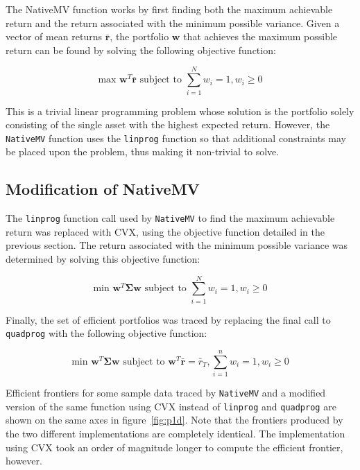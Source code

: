 \documentclass[a4paper, 12pt]{article}
\begin{document}
	The NativeMV function works by first finding both the maximum achievable return and the return associated with the minimum possible variance. Given a vector of mean returns $\bar{\mathbf{r}}$, the portfolio $\mathbf{w}$ that achieves the maximum possible return can be found by solving the following objective function:

	\[\text{max } \mathbf{w}^T \bar{\mathbf{r}} \text{ subject to } \sum_{i=1}^N w_i = 1, w_i \geq 0\]

	This is a trivial linear programming problem whose solution is the portfolio solely consisting of the single asset with the highest expected return. However, the \texttt{NativeMV} function uses the \texttt{linprog} function so that additional constraints may be placed upon the problem, thus making it non-trivial to solve.

	\subsection{Modification of NativeMV}

	The \texttt{linprog} function call used by \texttt{NativeMV} to find the maximum achievable return was replaced with CVX, using the objective function detailed in the previous section. The return associated with the minimum possible variance was determined by solving this objective function:

	\[\text{min } \mathbf{w}^T \mathbf{\Sigma w} \text{ subject to } \sum_{i=1}^N w_i = 1, w_i \geq 0\]

	Finally, the set of efficient portfolios was traced by replacing the final call to \texttt{quadprog} with the following objective function:

	\[\text{min } \mathbf{w}^T \mathbf{\Sigma w} \text{ subject to } \mathbf{w}^T \bar{\mathbf{r}} = \bar{r}_T, \sum_{i=1}^n w_i = 1, w_i \geq 0\]

	Efficient frontiers for some sample data traced by \texttt{NativeMV} and a modified version of the same function using CVX instead of \texttt{linprog} and \texttt{quadprog} are shown on the same axes in figure~\ref{fig:p1d}. Note that the frontiers produced by the two different implementations are completely identical. The implementation using CVX took an order of magnitude longer to compute the efficient frontier, however.
\end{document}
